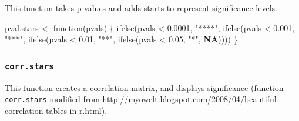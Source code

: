\documentclass[
  bookmarksnumbered]{article}
\newenvironment{Shaded}{\begin{snugshade}}{\end{snugshade}}
\newcommand{\ConstantTok}[1]{\textcolor[rgb]{0.86,0.64,0.64}{\textbf{#1}}}
\newcommand{\ControlFlowTok}[1]{\textcolor[rgb]{0.94,0.87,0.69}{#1}}
\newcommand{\FloatTok}[1]{\textcolor[rgb]{0.75,0.75,0.82}{#1}}
\newcommand{\FunctionTok}[1]{\textcolor[rgb]{0.94,0.94,0.56}{#1}}
\newcommand{\NormalTok}[1]{\textcolor[rgb]{0.80,0.80,0.80}{#1}}
\newcommand{\OtherTok}[1]{\textcolor[rgb]{0.94,0.94,0.56}{#1}}
\newcommand{\SpecialCharTok}[1]{\textcolor[rgb]{0.86,0.64,0.64}{#1}}
\newcommand{\StringTok}[1]{\textcolor[rgb]{0.80,0.58,0.58}{#1}}
\begin{document}
This function takes p-values and adds starts to represent significance levels.

\begin{Shaded}
\begin{Highlighting}[]
\NormalTok{pval.stars }\OtherTok{\textless{}{-}} \ControlFlowTok{function}\NormalTok{(pvals) \{}
  \FunctionTok{ifelse}\NormalTok{(pvals }\SpecialCharTok{\textless{}} \FloatTok{0.0001}\NormalTok{,}
         \StringTok{"****"}\NormalTok{,}
         \FunctionTok{ifelse}\NormalTok{(pvals }\SpecialCharTok{\textless{}} \FloatTok{0.001}\NormalTok{,}
                \StringTok{"***"}\NormalTok{,}
                \FunctionTok{ifelse}\NormalTok{(pvals }\SpecialCharTok{\textless{}} \FloatTok{0.01}\NormalTok{,}
                \StringTok{"**"}\NormalTok{,}
                       \FunctionTok{ifelse}\NormalTok{(pvals }\SpecialCharTok{\textless{}} \FloatTok{0.05}\NormalTok{,}
                       \StringTok{"*"}\NormalTok{, }\ConstantTok{NA}\NormalTok{))))}
\NormalTok{\}}
\end{Highlighting}
\end{Shaded}

\hypertarget{corr.stars}{%
\subsubsection{\texorpdfstring{\texttt{corr.stars}}{corr.stars}}\label{corr.stars}}

This function creates a correlation matrix, and displays significance (function \texttt{corr.stars} modified from \url{http://myowelt.blogspot.com/2008/04/beautiful-correlation-tables-in-r.html}).
\end{document}
